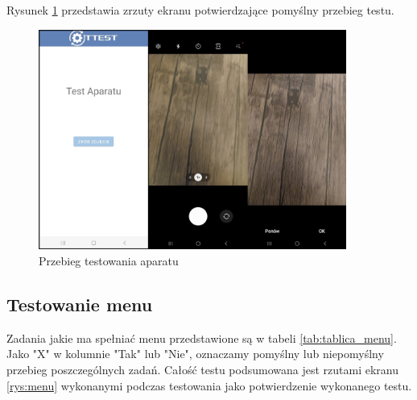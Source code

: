 Rysunek \ref{rys:aparat_5} przedstawia zrzuty ekranu potwierdzające pomyślny przebieg testu.

\begin{figure}[!hbt]
	\begin{center}
		\includegraphics[angle=360, width=0.90\textwidth]{rys/punkt5/aparat.jpg}
		\caption{Przebieg testowania aparatu}
		\label{rys:aparat_5}
	\end{center}
\end{figure} 

\newpage


\subsection{Testowanie menu}

\hspace{0.60cm}Zadania jakie ma spełniać menu przedstawione są w tabeli \ref{tab:tablica_menu}. Jako "X" w kolumnie "Tak" lub "Nie", oznaczamy pomyślny lub niepomyślny przebieg poszczególnych zadań. Całość testu podsumowana jest rzutami ekranu \ref{rys:menu} wykonanymi podczas testowania jako potwierdzenie wykonanego testu.

